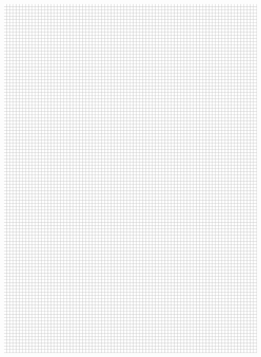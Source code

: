 \documentclass[12pt]{article}
\begin{document}
\newpage
\includegraphics[width=\textwidth]{graphpaper.png}
\newpage
\end{document}
